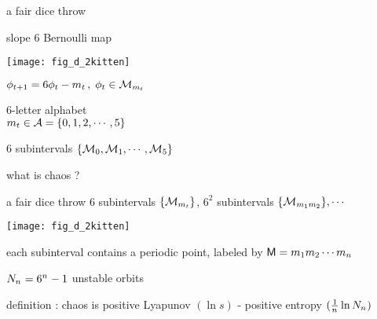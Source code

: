 \renewcommand{\ssp}{\ensuremath{\phi}}             %
\renewcommand{\ssp}{\ensuremath{\phi}}             %
\begin{frame}{a fair dice throw}
    \begin{block}{slope ${6}$ Bernoulli map}
\begin{center}
            \begin{minipage}[c]{0.32\textwidth}\begin{center}
\texttt{[image: fig\_d\_2kitten]} %
            \end{center}\end{minipage}
            \hspace{2ex}
            \begin{minipage}[c]{0.46\textwidth}
\(
\ssp_{\zeit+1}
= {6} \ssp_{\zeit} - \Ssym{\zeit}
\,,\;  \ssp_{\zeit}\in\pS_{\Ssym{\zeit}}
\)
\medskip

${6}$-letter alphabet \\
\(
{m_{t}} \in \mathcal{A}=\{0,1,2,\cdots,5\}
\)
            \end{minipage}
\end{center}
$6$ subintervals $\{{\cal M}_{0},{\cal M}_{1},\cdots,{\cal M}_{5}\}$
    \end{block}
\end{frame} %

\begin{frame}{what is chaos ?}
    \begin{block}{a fair dice throw}
$6$ subintervals $\{{\cal M}_{{m_{t}}}\}$,
$6^2$ subintervals $\{{\cal M}_{{m_{1}}{m_{2}}}\}, \cdots$
\begin{center}
            \begin{minipage}[c]{0.32\textwidth}\begin{center}
\texttt{[image: fig\_d\_2kitten]} %
            \end{center}\end{minipage}
            \hspace{2ex}
            \begin{minipage}[c]{0.46\textwidth}
each subinterval contains a periodic point,
labeled by
$\mathsf{M}={m_{1}}{m_{2}}\cdots{\ensuremath{m_{{n_{}}}}}$
\bigskip

$N_{n_{}} = 6^{n_{}}-1$ {\color{red}unstable} orbits
            \end{minipage}
\end{center}
    \end{block}
\vfill
    \begin{block}{definition : chaos is}
positive Lyapunov $(\ln s)$ - positive entropy $(\frac{1}{{n_{}}}\ln N_{n_{}})$
    \end{block}
\end{frame} %

